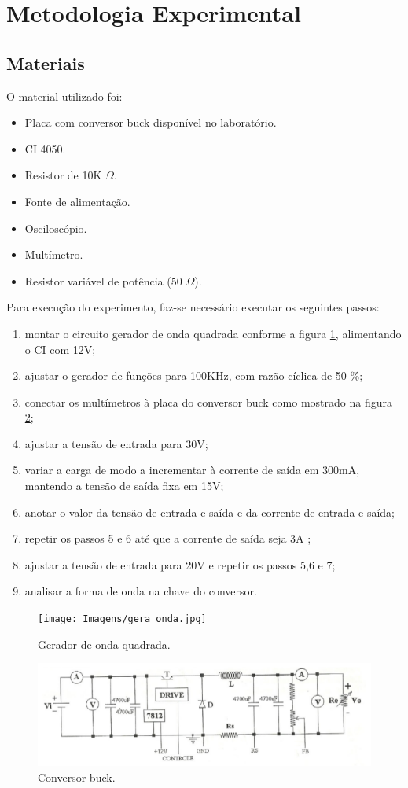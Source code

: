 \newpage
\section{Metodologia Experimental}

\subsection{Materiais}
O material utilizado foi:

\begin{itemize}
\item Placa com conversor buck disponível no laboratório.
\item CI 4050.
\item Resistor de 10K $\Omega$.
\item Fonte de alimentação.
\item Osciloscópio.
\item Multímetro.
\item Resistor variável de potência (50 $\Omega$).
\end{itemize}

Para execução do experimento, faz-se necessário executar os seguintes passos:

\begin{enumerate}
\item montar o circuito gerador de onda quadrada conforme a figura \ref{f_gera_onda}, alimentando o CI com 12V;
\item ajustar o gerador de funções para 100KHz, com razão cíclica de 50 \%;
\item conectar os multímetros à placa do conversor buck como mostrado na figura \ref{f_buck};
\item ajustar a tensão de entrada para 30V;
\item variar a carga de modo a incrementar à corrente de saída em 300mA, mantendo a tensão de saída fixa em 15V;
\item anotar o valor da tensão de entrada e saída e da corrente de entrada e saída;
\item repetir os passos 5 e 6 até que a corrente de saída seja 3A ;
\item ajustar a tensão de entrada para 20V e repetir os passos 5,6 e 7;
\item analisar a forma de onda na chave do conversor.
\end{enumerate}

\begin{figure}[H]
	\centering
	\texttt{[image: Imagens/gera\_onda.jpg]}
	\caption{Gerador de onda quadrada.}
	\label{f_gera_onda}
\end{figure}

\begin{figure}[H]
\centering
\includegraphics[scale=0.5]{Imagens/buck.jpg}
\caption{Conversor buck.}
\label{f_buck}
\end{figure}
